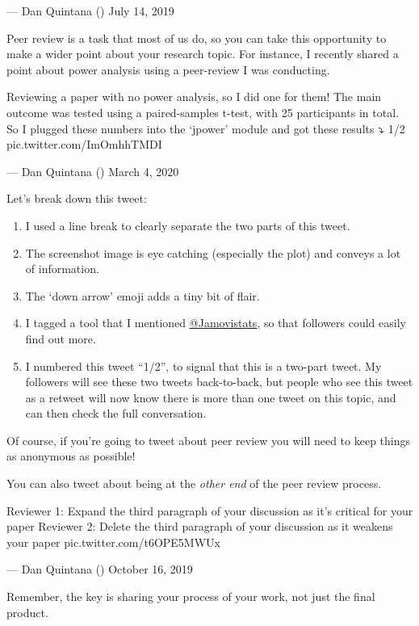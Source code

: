 \documentclass[]{book}
\providecommand{\tightlist}{%
  \setlength{\itemsep}{0pt}\setlength{\parskip}{0pt}}
\begin{document}
--- Dan Quintana (\citet{dsquintana}) July 14, 2019

Peer review is a task that most of us do, so you can take this opportunity to make a wider point about your research topic. For instance, I recently shared a point about power analysis using a peer-review I was conducting.

Reviewing a paper with no power analysis, so I did one for them! The main outcome was tested using a paired-samples t-test, with 25 participants in total. So I plugged these numbers into the \citet{jamovistats} `jpower' module and got these results ⤵️ 1/2 pic.twitter.com/ImOmhhTMDI

--- Dan Quintana (\citet{dsquintana}) March 4, 2020

Let's break down this tweet:

\begin{enumerate}
\def\labelenumi{\arabic{enumi}.}
\tightlist
\item
  I used a line break to clearly separate the two parts of this tweet.
\item
  The screenshot image is eye catching (especially the plot) and conveys a lot of information.
\item
  The `down arrow' emoji adds a tiny bit of flair.
\item
  I tagged a tool that I mentioned \href{https://twitter.com/Jamovistats}{@Jamovistats}, so that followers could easily find out more.
\item
  I numbered this tweet ``1/2'', to signal that this is a two-part tweet. My followers will see these two tweets back-to-back, but people who see this tweet as a retweet will now know there is more than one tweet on this topic, and can then check the full conversation.
\end{enumerate}

Of course, if you're going to tweet about peer review you will need to keep things as anonymous as possible!

You can also tweet about being at the \emph{other end} of the peer review process.

Reviewer 1: Expand the third paragraph of your discussion as it's critical for your paper Reviewer 2: Delete the third paragraph of your discussion as it weakens your paper pic.twitter.com/t6OPE5MWUx

--- Dan Quintana (\citet{dsquintana}) October 16, 2019

Remember, the key is sharing your process of your work, not just the final product.
\end{document}
